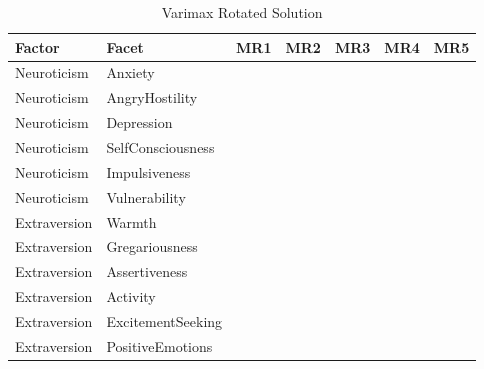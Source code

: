 \documentclass{article}\usepackage[]{graphicx}\usepackage[]{color}
\begin{document}
\begin{table}
\caption{\label{tab:unnamed-chunk-11}Varimax Rotated Solution}
\centering
\begin{tabular}[t]{lllllll}
\toprule
Factor & Facet & MR1 & MR2 & MR3 & MR4 & MR5\\
\midrule
Neuroticism & Anxiety & \cellcolor{white}{-0.05} & \cellcolor{yellow}{0.84} & \cellcolor{white}{0.16} & \cellcolor{white}{0.1} & \cellcolor{white}{0.07}\\
Neuroticism & AngryHostility & \cellcolor{white}{0.14} & \cellcolor{yellow}{0.62} & \cellcolor{white}{0.07} & \cellcolor{yellow}{-0.55} & \cellcolor{white}{0}\\
Neuroticism & Depression & \cellcolor{white}{-0.07} & \cellcolor{yellow}{0.86} & \cellcolor{white}{-0.13} & \cellcolor{white}{0.03} & \cellcolor{white}{0.08}\\
Neuroticism & SelfConsciousness & \cellcolor{white}{-0.18} & \cellcolor{yellow}{0.74} & \cellcolor{white}{0.14} & \cellcolor{white}{0.17} & \cellcolor{white}{0.05}\\
Neuroticism & Impulsiveness & \cellcolor{white}{0.4} & \cellcolor{white}{0.5} & \cellcolor{white}{-0.12} & \cellcolor{white}{-0.07} & \cellcolor{white}{0.13}\\
\addlinespace
Neuroticism & Vulnerability & \cellcolor{white}{-0.09} & \cellcolor{yellow}{0.82} & \cellcolor{white}{-0.1} & \cellcolor{white}{0.08} & \cellcolor{white}{-0.02}\\
Extraversion & Warmth & \cellcolor{yellow}{0.77} & \cellcolor{white}{0} & \cellcolor{white}{0.15} & \cellcolor{white}{0.37} & \cellcolor{white}{0.1}\\
Extraversion & Gregariousness & \cellcolor{yellow}{0.72} & \cellcolor{white}{-0.06} & \cellcolor{white}{0.07} & \cellcolor{white}{0.09} & \cellcolor{white}{0.05}\\
Extraversion & Assertiveness & \cellcolor{yellow}{0.6} & \cellcolor{white}{-0.22} & \cellcolor{white}{0.34} & \cellcolor{white}{-0.18} & \cellcolor{white}{0.04}\\
Extraversion & Activity & \cellcolor{yellow}{0.57} & \cellcolor{white}{0} & \cellcolor{white}{0.44} & \cellcolor{white}{-0.13} & \cellcolor{white}{0.17}\\
\addlinespace
Extraversion & ExcitementSeeking & \cellcolor{white}{0.5} & \cellcolor{white}{-0.01} & \cellcolor{white}{0.01} & \cellcolor{white}{-0.04} & \cellcolor{white}{0.31}\\
Extraversion & PositiveEmotions & \cellcolor{yellow}{0.65} & \cellcolor{white}{-0.21} & \cellcolor{white}{0.19} & \cellcolor{white}{0.25} & \cellcolor{white}{0.33}\\

\end{tabular}
\end{table}
\end{document}
